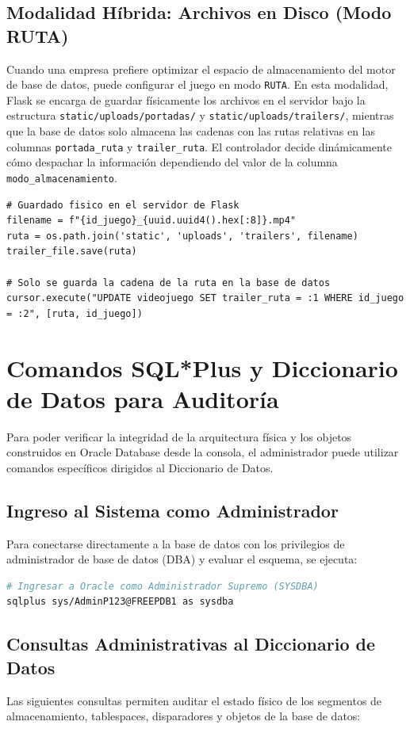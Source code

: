 \documentclass[12pt,a4paper]{article}
\begin{document}
\subsection{Modalidad Híbrida: Archivos en Disco (Modo RUTA)}
Cuando una empresa prefiere optimizar el espacio de almacenamiento del motor de base de datos, puede configurar el juego en modo \texttt{RUTA}. En esta modalidad, Flask se encarga de guardar físicamente los archivos en el servidor bajo la estructura \texttt{static/uploads/portadas/} y \texttt{static/uploads/trailers/}, mientras que la base de datos solo almacena las cadenas con las rutas relativas en las columnas \texttt{portada\_ruta} y \texttt{trailer\_ruta}. El controlador decide dinámicamente cómo despachar la información dependiendo del valor de la columna \texttt{modo\_almacenamiento}.

\begin{lstlisting}[caption=games\_controller.py (Almacenamiento en Disco)]
# Guardado fisico en el servidor de Flask
filename = f"{id_juego}_{uuid.uuid4().hex[:8]}.mp4"
ruta = os.path.join('static', 'uploads', 'trailers', filename)
trailer_file.save(ruta)

# Solo se guarda la cadena de la ruta en la base de datos
cursor.execute("UPDATE videojuego SET trailer_ruta = :1 WHERE id_juego = :2", [ruta, id_juego])
\end{lstlisting}

\section{Comandos SQL*Plus y Diccionario de Datos para Auditoría}
Para poder verificar la integridad de la arquitectura física y los objetos construidos en Oracle Database desde la consola, el administrador puede utilizar comandos específicos dirigidos al Diccionario de Datos.

\subsection{Ingreso al Sistema como Administrador}
Para conectarse directamente a la base de datos con los privilegios de administrador de base de datos (DBA) y evaluar el esquema, se ejecuta:
\begin{lstlisting}[language=bash]
# Ingresar a Oracle como Administrador Supremo (SYSDBA)
sqlplus sys/AdminP123@FREEPDB1 as sysdba
\end{lstlisting}

\subsection{Consultas Administrativas al Diccionario de Datos}
Las siguientes consultas permiten auditar el estado físico de los segmentos de almacenamiento, tablespaces, disparadores y objetos de la base de datos:
\end{document}
